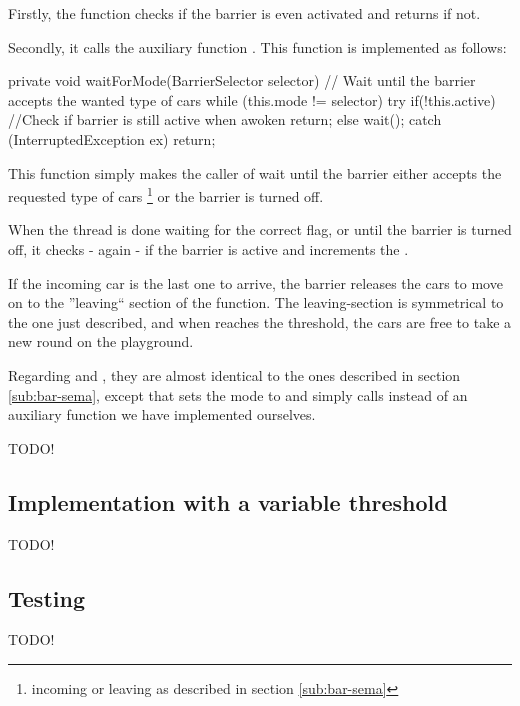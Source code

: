 Firstly, the function checks if the barrier is even activated and returns if not.

Secondly, it calls the auxiliary function . This function is implemented as follows:

\begin{java}
private void waitForMode(BarrierSelector selector) {
	// Wait until the barrier accepts the wanted type of cars
	while (this.mode != selector) {
		try {
			if(!this.active) //Check if barrier is still active when awoken
				return;
			else
				wait();
		}
		catch (InterruptedException ex) { return; }
	}
}
\end{java}

This function simply makes the caller of  wait until the barrier either accepts the requested type of cars 
\footnote{incoming or leaving as described in section \ref{sub:bar-sema}}
or the barrier is turned off.

When the thread is done waiting for the correct flag, or until the barrier is turned off, it checks - again - if the barrier is active and increments the .

If the incoming car is the last one to arrive, the barrier releases the cars to move on to the ''leaving`` section of the function. The leaving-section is symmetrical to the one just described, and when  reaches the threshold, the cars are free to take a new round on the playground.

Regarding  and , they are almost identical to the ones described in section \ref{sub:bar-sema}, except that  sets the mode to  and simply calls  instead of an auxiliary function we have implemented ourselves.

TODO!

\subsection{Implementation with a variable threshold}
\label{sub:bar-thres}
TODO!


\subsection{Testing}
\label{sub:bar-test}
TODO!